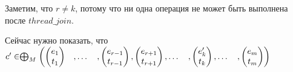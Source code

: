 Заметим, что $r \neq k$, потому что ни одна операция не может быть выполнена после $thread\_join$.

Сейчас нужно показать, что
$c' \in \mathrel{\bigoplus}_M
\begin{pmatrix}
\begin{pmatrix}
e_1 \\
t_1 
\end{pmatrix}&,
\dots& ,
\begin{pmatrix}
e_{r-1} \\
t_{r-1} 
\end{pmatrix},
\begin{pmatrix}
e_{r+1} \\
t_{r+1} 
\end{pmatrix},
\dots& ,
\begin{pmatrix}
e_k' \\
t_k 
\end{pmatrix} ,
\dots& ,
\begin{pmatrix}
e_m \\
t_m 
\end{pmatrix}
\end{pmatrix}
$

